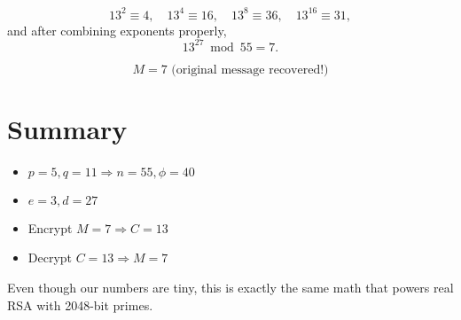 \documentclass[12pt]{article}
\begin{document}
\[
13^2 \equiv 4, \quad 13^4 \equiv 16, \quad 13^8 \equiv 36, \quad 13^{16} \equiv 31,
\]
and after combining exponents properly,
\[
13^{27} \bmod 55 = 7.
\]

\[
\boxed{M = 7 \text{ (original message recovered!)}}
\]

\section*{Summary}
\begin{itemize}
    \item \( p=5, q=11 \Rightarrow n=55, \phi=40 \)
    \item \( e=3, d=27 \)
    \item Encrypt \( M=7 \Rightarrow C=13 \)
    \item Decrypt \( C=13 \Rightarrow M=7 \)
\end{itemize}

\noindent Even though our numbers are tiny, this is exactly the same math that powers real RSA with 2048-bit primes.
\end{document}
